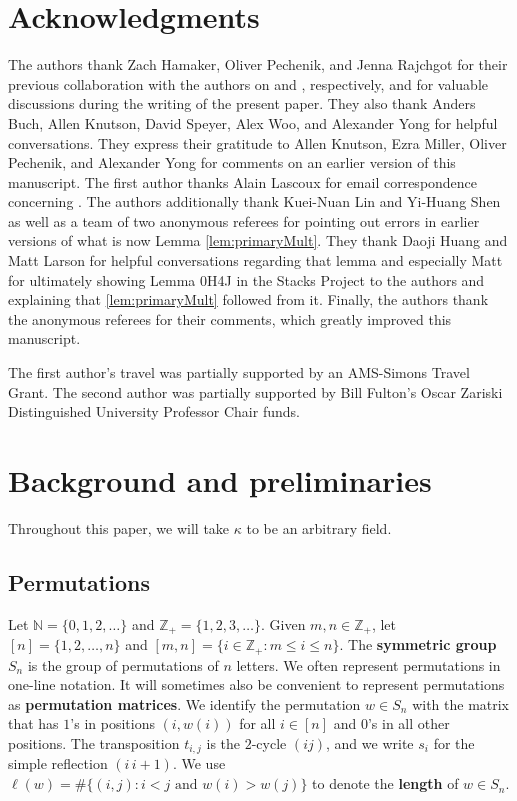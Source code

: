 \documentclass[12pt,reqno]{amsart}
\newtheorem{Main Conjecture}[theorem]{Main Conjecture}
\theoremstyle{remark}
\theoremstyle{plain}
\newcommand{\mydef}[1]{{\bf #1}}
\begin{document}
\section*{Acknowledgments}
The authors thank Zach Hamaker, Oliver Pechenik, and Jenna Rajchgot for their previous collaboration with the authors on \cite{HPW} and \cite{KR}, respectively, and for valuable  discussions during the writing of the present paper.  They also thank Anders Buch, Allen Knutson, David Speyer, Alex Woo, and Alexander Yong for helpful conversations.  They express their gratitude to Allen Knutson, Ezra Miller, Oliver Pechenik, and Alexander Yong for comments on an earlier version of this manuscript.  The first author thanks Alain Lascoux for email correspondence concerning \cite{LS96}. The authors additionally thank Kuei-Nuan Lin and Yi-Huang Shen as well as a team of two anonymous referees for pointing out errors in earlier versions of what is now Lemma \ref{lem:primaryMult}.  They thank Daoji Huang and Matt Larson for helpful conversations regarding that lemma and especially Matt for ultimately showing Lemma 0H4J in the Stacks Project to the authors and explaining that \ref{lem:primaryMult} followed from it.  Finally, the authors thank the anonymous referees for their comments, which greatly improved this manuscript.

  The first author's travel was partially supported by an AMS-Simons Travel Grant.  The second author was partially supported by Bill Fulton's Oscar Zariski Distinguished University Professor Chair funds.  

\section{Background and preliminaries}

Throughout this paper, we will take $\kappa$ to be an arbitrary field. 

\subsection{Permutations}

Let $\mathbb N=\{0,1,2,\ldots\}$ and $\mathbb Z_+=\{1,2,3,\ldots\}$.  Given $m,n\in \mathbb Z_+$, let $[n]=\{1,2,\ldots,n\}$ and $[m,n]=\{i\in \mathbb Z_+:m\leq i\leq n\}$.  The \mydef{symmetric group} $S_n$ is the group of permutations of $n$ letters.  We often represent permutations in one-line notation.  It will sometimes also be convenient to represent permutations as \mydef{permutation matrices}.  We identify the permutation $w\in S_n$ with the matrix that has $1$'s in positions $(i,w(i))$ for all $i\in [n]$ and $0$'s in all other positions.  The transposition $t_{i,j}$ is the $2$-cycle $(ij)$, and we write $s_i$ for the simple reflection $(i\, i+1)$.  We use $\ell(w)=\#\{(i,j):i<j \text{ and } w(i)>w(j)\}$ to denote the \mydef{length} of $w \in S_n$.
\end{document}
